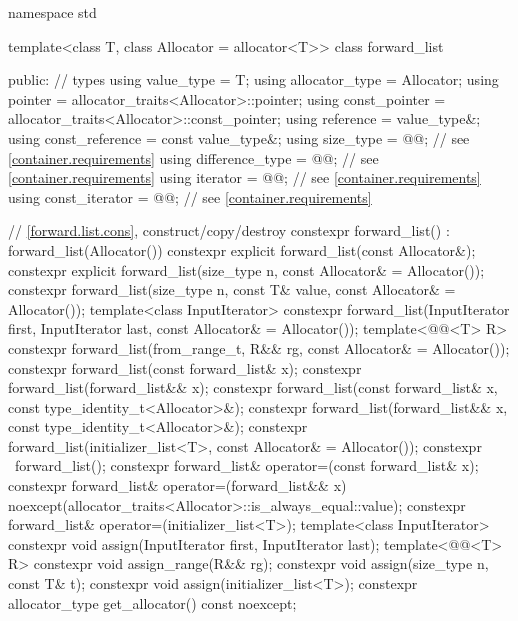 \begin{codeblock}
namespace std {
  template<class T, class Allocator = allocator<T>>
  class forward_list {
  public:
    // types
    using value_type      = T;
    using allocator_type  = Allocator;
    using pointer         = allocator_traits<Allocator>::pointer;
    using const_pointer   = allocator_traits<Allocator>::const_pointer;
    using reference       = value_type&;
    using const_reference = const value_type&;
    using size_type       = @@; // see \ref{container.requirements}
    using difference_type = @@; // see \ref{container.requirements}
    using iterator        = @@; // see \ref{container.requirements}
    using const_iterator  = @@; // see \ref{container.requirements}

    // \ref{forward.list.cons}, construct/copy/destroy
    constexpr forward_list() : forward_list(Allocator()) { }
    constexpr explicit forward_list(const Allocator&);
    constexpr explicit forward_list(size_type n, const Allocator& = Allocator());
    constexpr forward_list(size_type n, const T& value, const Allocator& = Allocator());
    template<class InputIterator>
      constexpr forward_list(InputIterator first, InputIterator last,
                             const Allocator& = Allocator());
    template<@@<T> R>
      constexpr forward_list(from_range_t, R&& rg, const Allocator& = Allocator());
    constexpr forward_list(const forward_list& x);
    constexpr forward_list(forward_list&& x);
    constexpr forward_list(const forward_list& x, const type_identity_t<Allocator>&);
    constexpr forward_list(forward_list&& x, const type_identity_t<Allocator>&);
    constexpr forward_list(initializer_list<T>, const Allocator& = Allocator());
    constexpr ~forward_list();
    constexpr forward_list& operator=(const forward_list& x);
    constexpr forward_list& operator=(forward_list&& x)
      noexcept(allocator_traits<Allocator>::is_always_equal::value);
    constexpr forward_list& operator=(initializer_list<T>);
    template<class InputIterator>
      constexpr void assign(InputIterator first, InputIterator last);
    template<@@<T> R>
      constexpr void assign_range(R&& rg);
    constexpr void assign(size_type n, const T& t);
    constexpr void assign(initializer_list<T>);
    constexpr allocator_type get_allocator() const noexcept;

}}
\end{codeblock}
